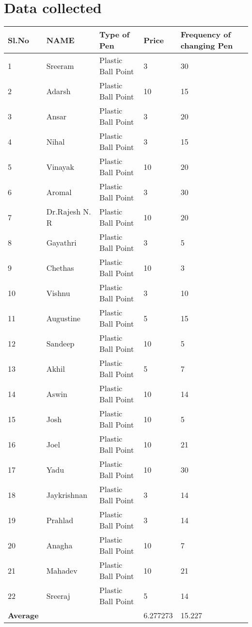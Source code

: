 \section{Data collected}\label{data}
\begin{table}[h!]\centering 
\begin{tabular}{|l|l|l|l|l|}
\hline 
\textbf{ Sl.No}&\textbf{NAME}&\textbf{Type of Pen}	&\textbf{Price}&\textbf{Frequency of changing Pen}\\ \hline
1&Sreeram	&	Plastic Ball Point	&	3	&	30	\\ \hline
2&Adarsh	&	Plastic Ball Point	&	10	&	15	\\ \hline
3&Ansar	&	Plastic Ball Point	&	3	&	20	\\ \hline
4&Nihal	&	Plastic Ball Point	&	3	&	15	\\ \hline
5&Vinayak 	&	Plastic Ball Point	&	10	&	20	\\ \hline
6&Aromal	&	Plastic Ball Point	&	3	&	30	\\ \hline
7&Dr.Rajesh N. R	&	Plastic Ball Point	&	10	&	20	\\ \hline
8&Gayathri	&	Plastic Ball Point	&	3	&	5	\\ \hline
9&Chethas	&	Plastic Ball Point	&	10	&	3	\\ \hline
10&Vishnu	&	Plastic Ball Point	&	3	&	10	\\ \hline
11&Augustine&	Plastic Ball Point	&	5	&	15	\\ \hline
12&Sandeep	&	Plastic Ball Point	&	10	&	5	\\ \hline
13&Akhil	&	Plastic Ball Point	&	5	&	7	\\ \hline
14&Aswin&	Plastic Ball Point	&	10	&	14	\\ \hline
15&Josh	&	Plastic Ball Point	&	10	&	5	\\ \hline
16&Joel	&	Plastic Ball Point	&	10	&	21	\\ \hline
17&Yadu&	Plastic Ball Point	&	10	&	30	\\ \hline
18&Jaykrishnan	&	Plastic Ball Point	&	3	&	14	\\ \hline
19&Prahlad	&	Plastic Ball Point	&	3	&	14	\\ \hline

20&Anagha&	Plastic Ball Point	&	10	&	7	\\ \hline
21&Mahadev&	Plastic Ball Point	&	10	&	21	\\ \hline
22&Sreeraj&	Plastic Ball Point	&	5	&	14	\\ \hline

\textbf{Average}	&		&		&	6.277273&15.227	\\ 
	\hline
\end{tabular}

\end{table}